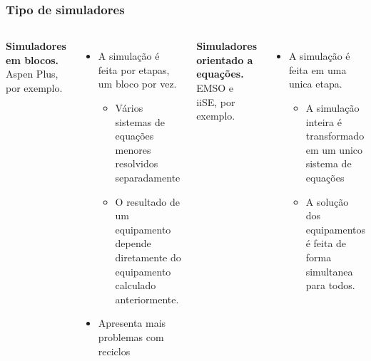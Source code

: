 \documentclass[aspectratio=169]{beamer}
\begin{document}
\begin{frame}
	\frametitle{Tipo de simuladores}
	\begin{columns}[t] 
			\textbf{Simuladores em blocos.}\\
			Aspen Plus, por exemplo.\\
			\begin{itemize}
				\item A simulação é feita por etapas, um bloco por vez.
				\begin{itemize}
					\item Vários sistemas de equações menores resolvidos separadamente
					\item O resultado de um equipamento depende diretamente do 
				equipamento calculado anteriormente.
				\end{itemize}
				\item Apresenta mais problemas com reciclos
			\end{itemize}
			\textbf{Simuladores orientado a equações.}\\
			EMSO e iiSE, por exemplo.\\
			\begin{itemize}
				\item A simulação é feita em uma unica etapa.
				\begin{itemize}
					\item A simulação inteira é transformado em um unico sistema de equações
					\item A solução dos equipamentos é feita de forma simultanea para
					todos.
				\end{itemize}
			\end{itemize}
	\end{columns}
\end{frame}
\end{document}
